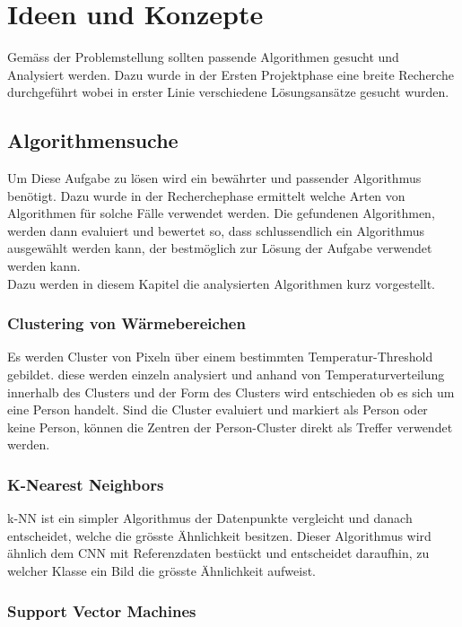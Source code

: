 \chapter{Ideen und Konzepte}

Gemäss der Problemstellung sollten passende Algorithmen gesucht und Analysiert werden. Dazu wurde in der Ersten Projektphase eine breite Recherche durchgeführt wobei in erster Linie verschiedene Lösungsansätze gesucht wurden.

\section{Algorithmensuche}

Um Diese Aufgabe zu lösen wird ein bewährter und passender Algorithmus benötigt. Dazu wurde in der Recherchephase ermittelt welche Arten von Algorithmen für solche Fälle verwendet werden. Die gefundenen Algorithmen, werden dann evaluiert und bewertet so, dass schlussendlich ein Algorithmus ausgewählt werden kann, der bestmöglich zur Lösung der Aufgabe verwendet werden kann.\\
Dazu werden in diesem Kapitel die analysierten Algorithmen kurz vorgestellt.

\subsection{Clustering von Wärmebereichen}

Es werden Cluster von Pixeln über einem bestimmten Temperatur-Threshold gebildet. diese werden einzeln analysiert und anhand von Temperaturverteilung innerhalb des Clusters und der Form des Clusters wird entschieden ob es sich um eine Person handelt. Sind die Cluster evaluiert und markiert als Person oder keine Person, können die Zentren der Person-Cluster direkt als Treffer verwendet werden.


\subsection{K-Nearest Neighbors}

\gls{k-NN} ist ein simpler Algorithmus der Datenpunkte vergleicht und danach entscheidet, welche die grösste Ähnlichkeit besitzen. Dieser Algorithmus wird ähnlich dem \gls{CNN} mit Referenzdaten bestückt und entscheidet daraufhin, zu welcher Klasse ein Bild die grösste Ähnlichkeit aufweist.

\subsection{Support Vector Machines}

